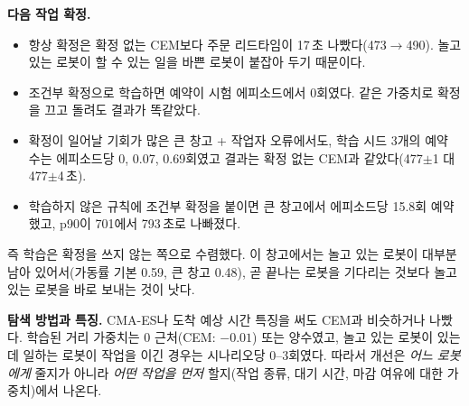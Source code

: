 \documentclass[10pt,twocolumn]{article}
\begin{document}
\textbf{다음 작업 확정.}
\begin{itemize}
  \item 항상 확정은 확정 없는 CEM보다 주문 리드타임이 17\,초 나빴다(473$\to$490). 놀고 있는 로봇이 할 수 있는 일을 바쁜 로봇이 붙잡아 두기 때문이다.
  \item 조건부 확정으로 학습하면 예약이 시험 에피소드에서 0회였다. 같은 가중치로 확정을 끄고 돌려도 결과가 똑같았다.
  \item 확정이 일어날 기회가 많은 큰 창고 + 작업자 오류에서도, 학습 시드 3개의 예약 수는 에피소드당 0, 0.07, 0.69회였고 결과는 확정 없는 CEM과 같았다(477$\pm$1 대 477$\pm$4\,초).
  \item 학습하지 않은 규칙에 조건부 확정을 붙이면 큰 창고에서 에피소드당 15.8회 예약했고, p90이 701에서 793\,초로 나빠졌다.
\end{itemize}
즉 학습은 확정을 쓰지 않는 쪽으로 수렴했다.
이 창고에서는 놀고 있는 로봇이 대부분 남아 있어서(가동률 기본 0.59, 큰 창고 0.48), 곧 끝나는 로봇을 기다리는 것보다 놀고 있는 로봇을 바로 보내는 것이 낫다.

\textbf{탐색 방법과 특징.}
CMA-ES나 도착 예상 시간 특징을 써도 CEM과 비슷하거나 나빴다.
학습된 거리 가중치는 0 근처(CEM: $-0.01$) 또는 양수였고,
놀고 있는 로봇이 있는데 일하는 로봇이 작업을 이긴 경우는 시나리오당 0--3회였다.
따라서 개선은 \emph{어느 로봇에게} 줄지가 아니라 \emph{어떤 작업을 먼저} 할지(작업 종류, 대기 시간, 마감 여유에 대한 가중치)에서 나온다.

\end{document}
